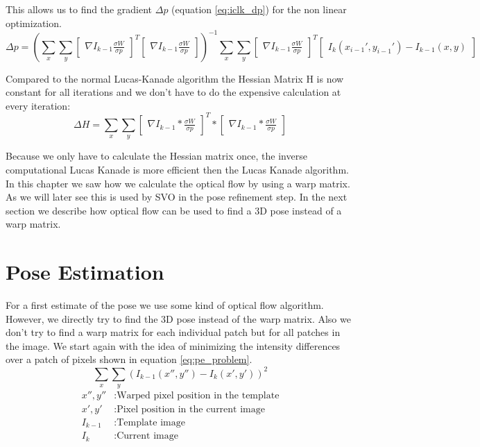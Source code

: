 \documentclass[11pt,a4paper,titlepage,oneside]{report}
\begin{document}
This allows us to find the gradient $\Delta p$ (equation \ref{eq:iclk_dp}) for the non linear optimization.
\tiny
\begin{equation}\label{eq:iclk_dp}
  \Delta p=(\sum_x\sum_y\begin{bmatrix}\nabla I_{k-1}\frac{\sigma W}{\sigma p}\end{bmatrix}^T\begin{bmatrix}\nabla I_{k-1}\frac{\sigma W}{\sigma p}\end{bmatrix})^{-1}
  \sum_x\sum_y\begin{bmatrix}\nabla I_{k-1}\frac{\sigma W}{\sigma p}\end{bmatrix}^T\begin{bmatrix}I_{k}(x_{i-1}',y_{i-1}') - I_{k-1}(x,y)\end{bmatrix}
\end{equation}
\normalsize

Compared to the normal Lucas-Kanade algorithm the Hessian Matrix H is now constant for all iterations and we don't have to do the expensive calculation at every iteration:
\begin{equation}
  \Delta H=\sum_x\sum_y\begin{bmatrix}\nabla I_{k-1}*\frac{\sigma W}{\sigma p}\end{bmatrix}^T*\begin{bmatrix}\nabla I_{k-1}*\frac{\sigma W}{\sigma p}\end{bmatrix}
\end{equation}

Because we only have to calculate the Hessian matrix once, the inverse computational Lucas Kanade is more efficient then the Lucas Kanade algorithm.\\
In this chapter we saw how we calculate the optical flow by using a warp matrix. As we will later see this is used by SVO in the pose refinement step. In the next section we describe how optical flow can be used to find a 3D pose instead of a warp matrix.

\section{Pose Estimation}\label{sec:pose_estimation}
For a first estimate of the pose we use some kind of optical flow algorithm. However, we directly try to find the 3D pose instead of the warp matrix. Also we don't try to find a warp matrix for each individual patch but for all patches in the image. We start again with the idea of minimizing the intensity differences over a patch of pixels shown in equation \ref{eq:pe_problem}.
\begin{equation}\label{eq:pe_problem}
  \sum_x\sum_y(I_{k-1}(x'',y'')-I_{k}(x',y'))^2
\end{equation}
\begin{align*}
  x'',y''    &:  \text{Warped pixel position in the template}\\
  x',y'      &:  \text{Pixel position in the current image}\\
  I_{k-1}        &:  \text{Template image}\\
  I_{k}          &:  \text{Current image}
\end{align*}
\end{document}

